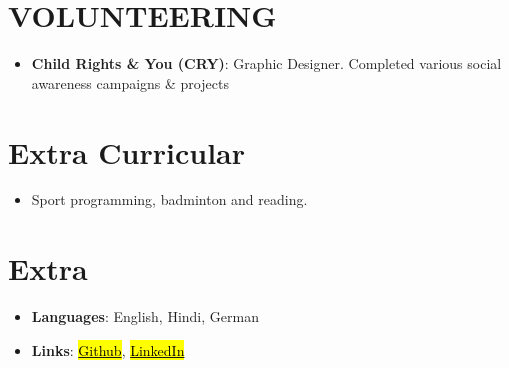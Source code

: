 \documentclass[letterpaper,11pt]{article}
\newcommand{\resumeItem}[2]{
  \item\normalsize{
    \textbf{#1}{#2}
  }
}
\newcommand{\resumeSubItem}[2]{\resumeItem{#1}{#2}\vspace{-4pt}}
\newcommand{\resumeSubHeadingListStart}{\begin{itemize}[leftmargin=*]}
\newcommand{\resumeSubHeadingListEnd}{\end{itemize}}
\begin{document}
\section{VOLUNTEERING}
  \resumeSubHeadingListStart
        \resumeSubItem{Child Rights \& You (CRY)}
        {:    Graphic Designer. Completed various social awareness campaigns \& projects}
        
    \resumeSubHeadingListEnd
    
\section{Extra Curricular}
    \resumeSubHeadingListStart
        \resumeSubItem{}
        {Sport programming, badminton and reading.}
    
    \resumeSubHeadingListEnd
    
\section{Extra}
    \resumeSubHeadingListStart
        \resumeSubItem{Languages}
        {:    English, Hindi, German}
            
        \resumeSubItem{Links}
        {:    
        \href{https://github.com/prakashdanish}{\hl{Github}},         
        \href{https://www.linkedin.com/in/danishprakash/}{\hl{LinkedIn}}}
        
    \resumeSubHeadingListEnd
    
    
\end{document}
